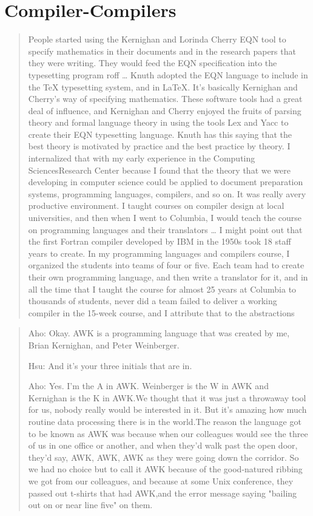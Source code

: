 \section{Compiler-Compilers}
\begin{quotation}
    People started using the Kernighan and Lorinda Cherry EQN tool to specify mathematics in their 
documents and in the research papers that they were writing. They would feed the EQN specification 
into the typesetting program roff
\dots
Knuth adopted the EQN language to include in the TeX typesetting system, and in LaTeX. It's 
basically Kernighan and Cherry's way of specifying mathematics. These software tools had a great 
deal of influence, and Kernighan and Cherry enjoyed the fruits of parsing theory and formal language 
theory in using the tools Lex and Yacc to create their EQN typesetting language. Knuth has this 
saying that the best theory is motivated by practice and the best practice by theory. I internalized 
that with my early experience in the Computing SciencesResearch Center because I found that the 
theory that we were developing in computer science could be applied to document preparation systems, 
programming languages, compilers, and so on. It was really avery productive environment. I taught 
courses on compiler design at local universities, and then when I went to Columbia, I would teach 
the course on programming languages and their translators
\dots
I might point out that the first Fortran compiler developed by IBM in the 1950s took 18 staff years 
to create. In my programming languages and compilers course, I organized the students into teams of 
four or five. Each team had to create their own programming language, and then write a translator 
for it, and in all the time that I taught the course for almost 25 years at Columbia to thousands of 
students, never did a team failed to deliver a working compiler in the 15-week course, and I 
attribute that to the abstractions
\cite{aho_oral_history_2022}
\end{quotation}
\begin{quotation}
    Aho: Okay. AWK is a programming language that was created by me, Brian 
Kernighan, and Peter Weinberger.

Hsu: And it's your three initials that are in.

Aho: Yes. I'm the A in AWK. Weinberger is the W in AWK and Kernighan is the 
K in AWK.We thought that it was just a throwaway tool for us, nobody really 
would be interested in it. But it's amazing how much routine data processing 
there is in the world.The reason the language got to be known as AWK was because 
when our colleagues would see the three of us in one office or another, and when 
they'd walk past the open door, they'd say, AWK, AWK, AWK as they were going 
down the corridor. So we had no choice but to call it AWK because of the 
good-natured ribbing we got from our colleagues, and because at some Unix 
conference, they passed out t-shirts that had AWK,and the error message saying 
"bailing out on or near line five" on them.
\end{quotation}
